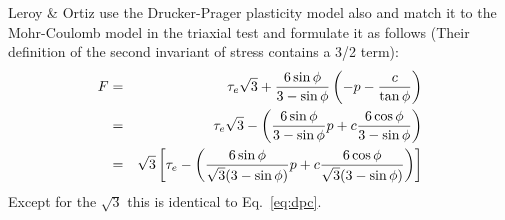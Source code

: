 


\vspace{1.3cm}
\begin{remark}
Leroy \& Ortiz \cite{leor89} use the Drucker-Prager plasticity model also and match it to the Mohr-Coulomb model in the 
triaxial test and formulate it as follows 
(Their definition of the second invariant of stress contains a 3/2 term):
\begin{eqnarray}
F 
&=& \tau_e \sqrt{3} + \frac{6 \sin\phi}{3-\sin\phi} \left( -p  - \frac{c}{\tan \phi} \right) \nonumber\\
&=& \tau_e \sqrt{3} - \left( \frac{6 \sin\phi}{3-\sin\phi}  p  + c \frac{6 \cos\phi}{3-\sin\phi} \right) \nonumber\\
&=& \sqrt{3} \left[ \tau_e  - \left( \frac{6 \sin\phi}{\sqrt{3}(3-\sin\phi)}  p  + c \frac{6 \cos\phi}{\sqrt{3}(3-\sin\phi)} \right)  \right]
\end{eqnarray}
Except for the $\sqrt{3}$ this is identical to Eq.~\eqref{eq:dpc}.
\end{remark}

